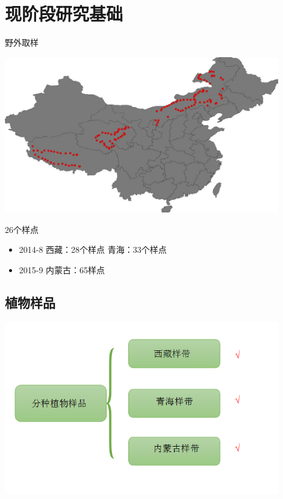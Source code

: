 \section{现阶段研究基础}
\begin{frame}{\insertsection}{\insertsubsection}
	野外取样
	\begin{center}
		\includegraphics[width = 0.9\textwidth]{./pic/3.1.jpg}
	\end{center}
	26个样点
	\begin{itemize}
		\item 2014-8	西藏：28个样点		青海：33个样点
		\item 2015-9	内蒙古：65样点
	\end{itemize}
\end{frame}

\subsection{植物样品}
\begin{frame}{\insertsection}{\insertsubsection}
		\begin{center}
			\includegraphics[width = 0.9\textwidth]{./pic/3.2.png}
		\end{center}
\end{frame}
